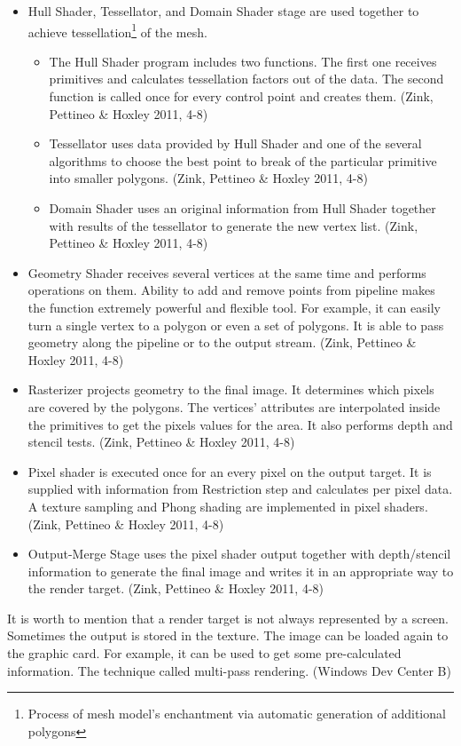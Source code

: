 \documentclass[twoside, english, 11pt]{report}
\begin{document}
\begin{itemize}
\item Hull Shader, Tessellator, and Domain Shader stage are used together to achieve tessellation\footnote{Process of mesh model's enchantment via automatic generation of additional polygons} of the mesh.
  \begin{itemize}
    \item The Hull Shader program includes two functions. The first one receives primitives and calculates tessellation factors out of the data. The second function is called once for every control point and creates them. (Zink, Pettineo \& Hoxley 2011, 4-8)
    \item Tessellator uses data provided by Hull Shader and one of the several algorithms to choose the best point to break of the particular primitive into smaller polygons. (Zink, Pettineo \& Hoxley 2011, 4-8)
    \item Domain Shader uses an original information from Hull Shader together with results of the tessellator to generate the new vertex list. (Zink, Pettineo \& Hoxley 2011, 4-8)
  \end{itemize}
\item Geometry Shader receives several vertices at the same time and performs operations on them. Ability to add and remove points from pipeline makes the function extremely powerful and flexible tool. For example, it can easily turn a single vertex to a polygon or even a set of polygons. It is able to pass geometry along the pipeline or to the output stream. (Zink, Pettineo \& Hoxley 2011, 4-8)
\item Rasterizer projects geometry to the final image. It determines which pixels are covered by the polygons. The vertices' attributes are interpolated inside the primitives to get the pixels values for the area. It also performs depth and stencil tests. (Zink, Pettineo \& Hoxley 2011, 4-8)
\item Pixel shader is executed once for an every pixel on the output target. It is supplied with information from Restriction step and calculates per pixel data. A texture sampling and Phong shading are implemented in pixel shaders. (Zink, Pettineo \& Hoxley 2011, 4-8)
\item Output-Merge Stage uses the pixel shader output together with depth/stencil information to generate the final image and writes it in an appropriate way to the render target. (Zink, Pettineo \& Hoxley 2011, 4-8)
\end{itemize}

It is worth to mention that a render target is not always represented by a screen. Sometimes the output is stored in the texture. The image can be loaded again to the graphic card. For example, it can be used to get some pre-calculated information. The technique called multi-pass rendering. (Windows Dev Center B)
\end{document}
